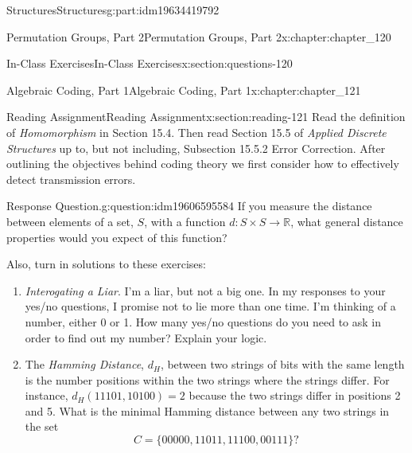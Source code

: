 \documentclass[oneside,10pt,]{book}
\numberwithin{equation}{section}
\begin{document}
\begin{partptx}{Structures}{}{Structures}{}{}{g:part:idm19634419792}
\begin{chapterptx}{Permutation Groups, Part 2}{}{Permutation Groups, Part 2}{}{}{x:chapter:chapter_120}
\begin{sectionptx}{In-Class Exercises}{}{In-Class Exercises}{}{}{x:section:questions-120}
\begin{enumerate}[label=\arabic*.]
\end{enumerate}
%
\end{sectionptx}
\end{chapterptx}
%
\typeout{************************************************}
\typeout{************************************************}
%
\begin{chapterptx}{Algebraic Coding, Part 1}{}{Algebraic Coding, Part 1}{}{}{x:chapter:chapter_121}
\index{}%
%
%
\typeout{************************************************}
\typeout{************************************************}
%
\begin{sectionptx}{Reading Assignment}{}{Reading Assignment}{}{}{x:section:reading-121}
Read the definition of \emph{Homomorphism} in Section 15.4. Then read Section 15.5 of \emph{Applied Discrete Structures} up to, but not including, Subsection 15.5.2 Error Correction. After outlining the objectives behind coding theory we first consider how to effectively detect transmission errors.%
\begin{question}{Response Question.}{g:question:idm19606595584}%
If you measure the distance between elements of a set, \(S\), with a function \(d: S\times S \rightarrow \mathbb{R}\), what general distance properties would you expect of this function?%
\end{question}
Also, turn in solutions to these exercises:%
\begin{enumerate}[label=\arabic*.]
\item{}\emph{Interogating a Liar}.  I'm a liar, but not a big one.  In my responses to your yes\slash{}no questions, I promise not to lie more than one time.  I'm thinking of a number, either 0 or 1.  How many yes\slash{}no questions do you need to ask in order to find out my number? Explain your logic.%
\item{}The \emph{Hamming Distance}, \(d_H\), between two strings of bits with the same length is the number positions within the two strings where the strings differ.  For instance, \(d_H(11101,10100)=2\) because the two strings differ in positions 2 and 5.  What is the minimal Hamming distance between any two strings in the set%
\begin{equation*}
C =\{00000,11011,11100,00111\}?
\end{equation*}
%
\end{enumerate}
%
\end{sectionptx}
%
%
\typeout{************************************************}

\end{chapterptx}
\end{partptx}
\end{document}
